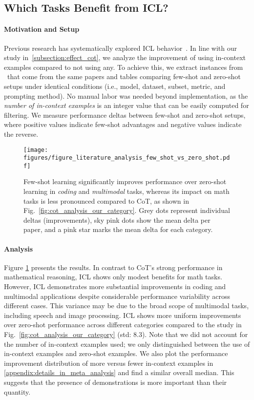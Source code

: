 \subsection{Which Tasks Benefit from ICL?}
\label{subsection:effect_icl}


\paragraph{Motivation and Setup}

Previous research has systematically explored ICL behavior~\citep{min2022rethinking, agarwal2024many, wei2023larger, bertsch2024context}. 
In line with our study in~\cref{subsection:effect_cot}, we analyze the improvement of using in-context examples compared to not using any. 
To achieve this, we extract instances from \datasetname~that come from the same papers and tables comparing few-shot and zero-shot setups under identical conditions (i.e., model, dataset, subset, metric, and prompting method).
No manual labor was needed beyond implementation, as the \textit{number of in-context examples} is an integer value that can be easily computed for filtering. 
We measure performance deltas between few-shot and zero-shot setups, where positive values indicate few-shot advantages and negative values indicate the reverse.


\begin{figure}[t!]
    \centering
    \texttt{[image: figures/figure\_literature\_analysis\_few\_shot\_vs\_zero\_shot.pdf]}
    \caption{
    Few-shot learning significantly improves performance over zero-shot learning in \emph{coding} and \emph{multimodal} tasks, whereas its impact on math tasks is less pronounced compared to CoT, as shown in Fig.~\ref{fig:cot_analysis_our_category}.
     Grey dots represent individual deltas (improvements), sky pink dots show the mean delta per paper, and a pink star marks the mean delta for each category.}
    \label{fig:icl_improvement}
\end{figure}

\paragraph{Analysis}
Figure \ref{fig:icl_improvement} presents the results. 
In contrast to CoT's strong performance in mathematical reasoning, ICL shows only modest benefits for math tasks.
However, ICL demonstrates more substantial improvements in coding and multimodal applications despite considerable performance variability across different cases.
This variance may be due to the broad scope of multimodal tasks, including speech and image processing. 
ICL shows more uniform improvements over zero-shot performance across different categories compared to the study in Fig.~\ref{fig:cot_analysis_our_category} (std: 8.3).
Note that we did not account for the number of in-context examples used; we only distinguished between the use of in-context examples and zero-shot examples. 
We also plot the performance improvement distribution of more versus fewer in-context examples in \cref{appendix:details_in_meta_analysis} and find a similar overall median. 
This suggests that the presence of demonstrations is more important than their quantity.


